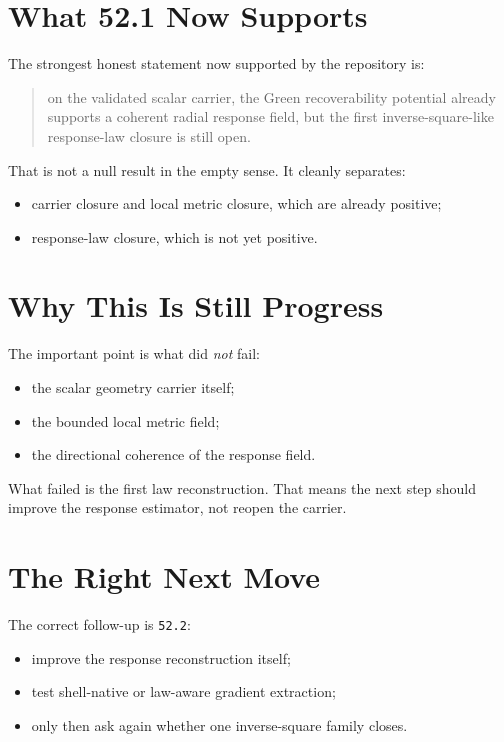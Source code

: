 \documentclass[11pt]{article}
\begin{document}
\section{What 52.1 Now Supports}

The strongest honest statement now supported by the repository is:

\begin{quote}
on the validated scalar carrier, the Green recoverability potential already supports a coherent radial response field, but the first inverse-square-like response-law closure is still open.
\end{quote}

That is not a null result in the empty sense. It cleanly separates:
\begin{itemize}
\item carrier closure and local metric closure, which are already positive;
\item response-law closure, which is not yet positive.
\end{itemize}

\section{Why This Is Still Progress}

The important point is what did \emph{not} fail:
\begin{itemize}
\item the scalar geometry carrier itself;
\item the bounded local metric field;
\item the directional coherence of the response field.
\end{itemize}

What failed is the first law reconstruction. That means the next step should improve the response estimator, not reopen the carrier.

\section{The Right Next Move}

The correct follow-up is \texttt{52.2}:
\begin{itemize}
\item improve the response reconstruction itself;
\item test shell-native or law-aware gradient extraction;
\item only then ask again whether one inverse-square family closes.
\end{itemize}
\end{document}
